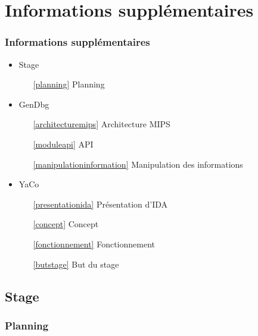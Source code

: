 \documentclass[11pt]{beamer}
\begin{document}
	\section*{Informations supplémentaires}
		\begin{frame}
			\frametitle{Informations supplémentaires}
			\begin{itemize}
				\item Stage
					\begin{itemize}
						\item[\ref{planning}] Planning
					\end{itemize}
				\item GenDbg
					\begin{itemize}
						\item[\ref{architecturemips}] Architecture MIPS
						\item[\ref{moduleapi}] API
						\item[\ref{manipulationinformation}] Manipulation des informations
					\end{itemize}
				\item YaCo
					\begin{itemize}
						\item[\ref{presentationida}] Présentation d'IDA
						\item[\ref{concept}] Concept
						\item[\ref{fonctionnement}] Fonctionnement
						\item[\ref{butstage}] But du stage
					\end{itemize}
			\end{itemize}
		\end{frame}
		\subsection*{Stage}
			\begin{frame}\label{planning}
				\frametitle{Planning}
				\hspace*{-10pt}%
				\centering{}
			\end{frame}
\end{document}
